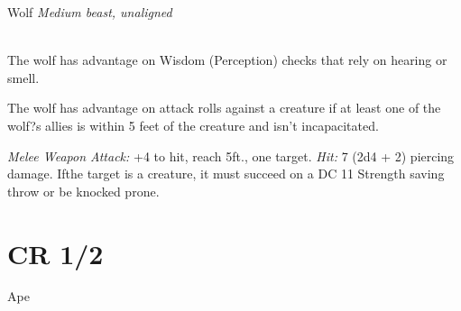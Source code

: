 \documentclass[10pt,twoside,twocolumn,openany]{book}
\begin{document}
\begin{monsterboxnobg}{Wolf}
	\textit{Medium beast, unaligned}\\
	\hline
	\basics[
		armorclass	= 13,
		hitpoints 		= 11 (2d8 + 2),
		speed		= {40 ft.}
	]
	\hline
	\stats[
		STR	= \stat{12},
		DEX	= \stat{15},
		CON	= \stat{12},
		INT	= \stat{3},
		WIS	= \stat{12},
		CHA	= \stat{6}
	]
	\hline
	\details[
		skills			= {Perception +3, Stealth +4},
		senses		= {passive Perception 13},
		languages		= {-},
		challenge		= 1/4
	]
	\hline \\[1mm]
	\begin{monsteraction}
		The wolf has advantage on Wisdom (Perception) checks that rely on hearing or smell.
	\end{monsteraction}
	
	\begin{monsteraction}
		The wolf has advantage on attack rolls against a creature if at least one of the wolf?s allies is within 5 feet of the creature and isn't incapacitated.
	\end{monsteraction}
	\begin{monsteraction}[Bite]
		\textit{Melee Weapon Attack:} +4 to hit, reach 5ft., one target. \textit{Hit:} 7 (2d4 + 2) piercing damage. Ifthe target is a creature, it must succeed on a DC 11 Strength saving throw or be knocked prone.
	\end{monsteraction}
\end{monsterboxnobg}
\newpage
\section{CR 1/2}

Ape
\end{document}
